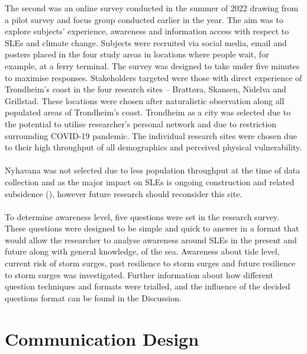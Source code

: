The second was an online survey conducted in the summer of 2022 drawing from a pilot survey and focus group conducted earlier in the year. The aim was to explore subjects' experience, awareness and information access with respect to SLEs and climate change. Subjects were recruited via social media, email and posters placed in the four study areas in locations where people wait, for example, at a ferry terminal. The survey was designed to take under five minutes to maximise responses. Stakeholders targeted were those with direct experience of Trondheim’s coast in the four research sites – Brattøra, Skansen, Nidelva and Grillstad. These locations were chosen after naturalistic observation along all populated areas of Trondheim’s coast. Trondheim as a city was selected due to the potential to utilise researcher's personal network and due to restriction surrounding COVID-19 pandemic. The individual research sites were chosen due to their high throughput of all demographics and perceived physical vulnerability.
\paragraph{}
Nyhavana was not selected due to less population throughput at the time of data collection and as the major impact on SLEs is ongoing construction and related subsidence (\cite{miljoenheten_og_byplankontoret_trondheim_kommune_9-notat-om-havnivastigning-og-stormflo---hensyn-i-arealplanlegging-nyhavnapdf_2020}), however future research should reconsider this site.  
\paragraph{}
To determine awareness level, five questions were set in the research survey. These questions were designed to be simple and quick to answer in a format that would allow the researcher to analyse awareness around SLEs in the present and future along with general knowledge, of the sea. Awareness about tide level, current risk of storm surges, past resilience to storm surges and future resilience to storm surges was investigated. Further information about how different question techniques and formats were trialled, and the influence of the decided questions format can be found in the Discussion.



\section{Communication Design}

